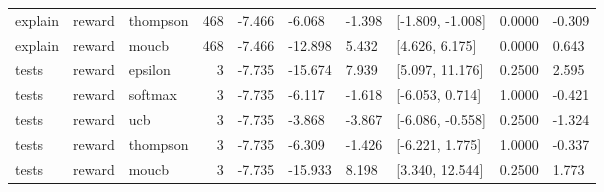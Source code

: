 \begin{tabular}{lllrllllll}
explain & reward & thompson & 468 & -7.466 & -6.068 & -1.398 & [-1.809, -1.008] & 0.0000 & -0.309 \\
explain & reward & moucb & 468 & -7.466 & -12.898 & 5.432 & [4.626, 6.175] & 0.0000 & 0.643 \\
tests & reward & epsilon & 3 & -7.735 & -15.674 & 7.939 & [5.097, 11.176] & 0.2500 & 2.595 \\
tests & reward & softmax & 3 & -7.735 & -6.117 & -1.618 & [-6.053, 0.714] & 1.0000 & -0.421 \\
tests & reward & ucb & 3 & -7.735 & -3.868 & -3.867 & [-6.086, -0.558] & 0.2500 & -1.324 \\
tests & reward & thompson & 3 & -7.735 & -6.309 & -1.426 & [-6.221, 1.775] & 1.0000 & -0.337 \\
tests & reward & moucb & 3 & -7.735 & -15.933 & 8.198 & [3.340, 12.544] & 0.2500 & 1.773 \\
\bottomrule
\end{tabular}
